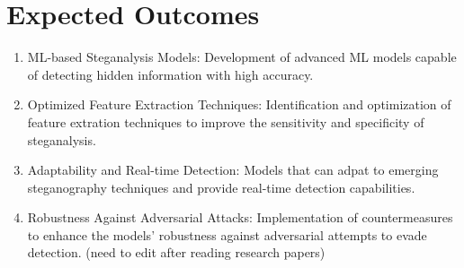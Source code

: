 \chapter{Expected Outcomes}
\begin{enumerate}[noitemsep]
\item ML-based Steganalysis Models: Development of advanced ML models capable of detecting hidden information with high accuracy.
\item Optimized Feature Extraction Techniques: Identification and optimization of feature extration techniques to improve the sensitivity and specificity of steganalysis.
\item Adaptability and Real-time Detection: Models that can adpat to emerging steganography techniques and provide real-time detection capabilities.
\item Robustness Against Adversarial Attacks: Implementation of countermeasures to enhance the models' robustness against adversarial attempts to evade detection. (need to edit after reading research papers)

\end{enumerate}

